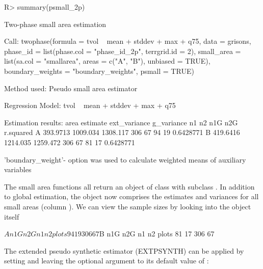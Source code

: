\begin{small}
\begin{Schunk}
\begin{Sinput}
R> summary(psmall_2p)
\end{Sinput}
\begin{Soutput}
Two-phase small area estimation
 
Call: 
twophase(formula = tvol ~ mean + stddev + max + q75, data = grisons, 
    phase_id = list(phase.col = "phase_id_2p", terrgrid.id = 2), 
    small_area = list(sa.col = "smallarea", areas = c("A", "B"), 
        unbiased = TRUE), boundary_weights = "boundary_weights", 
    psmall = TRUE)

Method used:
Pseudo small area estimator
 
Regression Model:
tvol ~ mean + stddev + max + q75

Estimation results:
 area estimate ext_variance g_variance  n1 n2 n1G n2G r.squared
    A 393.9713     1009.034   1308.117 306 67  94  19 0.6428771
    B 419.6416     1214.035   1259.472 306 67  81  17 0.6428771

'boundary_weight'- option was used to calculate weighted means of auxiliary variables
\end{Soutput}
\end{Schunk}
\end{small}

The small area functions all return an  object of class  with subclass . In addition to global estimation, the  object now comprises the estimates and variances for all small areas (column ). We can view the sample sizes by looking into the object itself
\begin{small}
\begin{Schunk}
\begin{Soutput}
$A
      n1G n2G  n1 n2
plots  94  19 306 67

$B
      n1G n2G  n1 n2
plots  81  17 306 67
\end{Soutput}
\end{Schunk}
\end{small}

The extended pseudo synthetic estimator (EXTPSYNTH) can be applied by setting  and leaving the optional argument  to its default value of :



